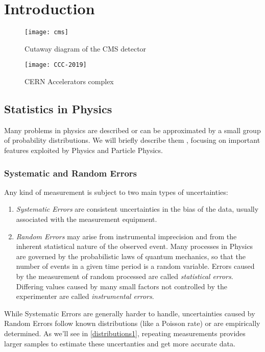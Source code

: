 \chapter{Introduction}

\begin{figure}
	\centerline{
		\texttt{[image: cms]}}
	\caption{Cutaway diagram of the CMS detector \cite{Sakuma_2014}}

\end{figure}

\begin{figure}
	\centerline{
		\texttt{[image: CCC-2019]}}
	\caption{CERN Accelerators complex \cite{Mobs:2684277}}
\end{figure}

\section{Statistics in Physics}

Many problems in physics are described or can be approximated by a small group of probability distributions. We will briefly describe them \cite{leo2012techniques}, focusing on important features exploited by Physics and Particle Physics.

\subsection{Systematic and Random Errors}

Any kind of measurement is subject to two main types of uncertainties:

\begin{enumerate}
	\item \textit{Systematic Errors} are consistent uncertainties in the bias of the data, usually associated with the measurement equipment.
	\item \textit{Random Errors} may arise from instrumental imprecision and from the inherent statistical nature of the observed event. Many processes in Physics are governed by the probabilistic laws of quantum mechanics, so that the number of events in a given time period is a random variable. Errors caused by the measurement of random processed are called \textit{statistical errors}. Differing values caused by many small factors not controlled by the experimenter are called \textit{instrumental errors}.
\end{enumerate}

While Systematic Errors are generally harder to handle, uncertainties caused by Random Errors follow known distributions (like a Poisson rate) or are empirically determined. As we'll see in \ref{distributions1}, repeating measurements provides larger samples to estimate these uncertanties and get more accurate data.


